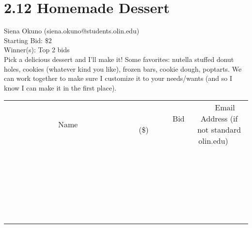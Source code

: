 \documentclass[11pt]{article}
\begin{document}
\section*{2.12 Homemade Dessert}
Siena Okuno (siena.okuno@students.olin.edu) \\
Starting Bid: \$2 \\
Winner(s): 
Top 2 bids \\
Pick a delicious dessert and I'll make it! Some favorites: nutella stuffed donut holes, cookies (whatever kind you like), frozen bars, cookie dough, poptarts. We can work together to make sure I customize it to your needs/wants (and so I know I can make it in the first place). \\[6ex]
\begin{tabular}{c c c}
~~~~~~~~~~~~~Name~~~~~~~~~~~~~ & ~~~~~~~~~Bid (\$)~~~~~~~~~ & ~~~Email Address (if not standard olin.edu)~~~ \\
 & & \\
\hline
 & & \\
\hline
 & & \\
\hline
 & & \\
\hline
 & & \\
\hline
 & & \\
\hline
 & & \\
\hline
 & & \\
\hline
 & & \\
\hline
 & & \\
\hline
 & & \\
\hline
 & & \\
\hline
 & & \\
\hline
 & & \\
\hline
 & & \\
\hline
 & & \\
\hline
 & & \\
\hline
 & & \\
\hline
 & & \\
\hline
 & & \\
\hline
 & & \\
\hline
 & & \\
\hline
 & & \\
\hline
 & & \\
\hline
 & & \\
\hline
 & & \\
\hline
\end{tabular}
\clearpage
\end{document}
